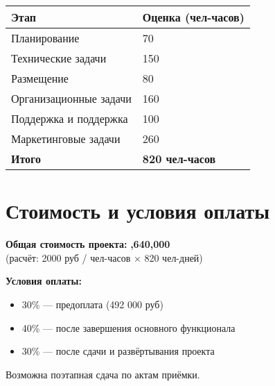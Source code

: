 \documentclass[14pt, russian]{matmex-diploma-custom}
\begin{document}
\begin{tabular}{|p{10cm}|p{4cm}|}
\hline
\textbf{Этап} & \textbf{Оценка (чел-часов)} \\
    \hline
    Планирование & 70 \\
    \hline
    Технические задачи & 150 \\
    \hline
    Размещение & 80 \\
    \hline
    Организационные задачи & 160 \\
    \hline
    Поддержка и поддержка & 100 \\
    \hline
    Маркетинговые задачи & 260 \\
    \hline
    \textbf{Итого} & \textbf{820 чел-часов} \\
    \hline
\end{tabular}

\section{Стоимость и условия оплаты}

\textbf{Общая стоимость проекта:} \textbf{,640,000} \\
(расчёт: 2000 руб / чел-часов × 820 чел-дней)

\bigskip

\textbf{Условия оплаты:}
\begin{itemize}[noitemsep]
    \item 30\% — предоплата (492 000 руб)
    \item 40\% — после завершения основного функционала
    \item 30\% — после сдачи и развёртывания проекта
\end{itemize}

Возможна поэтапная сдача по актам приёмки.
\end{document}
